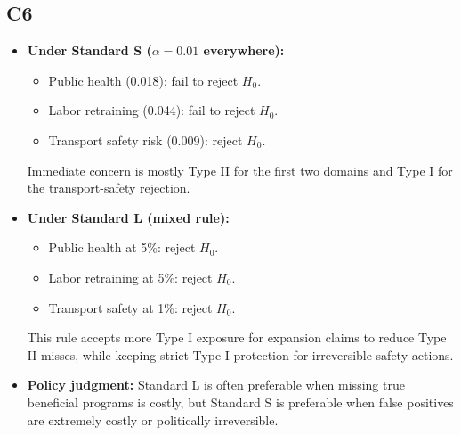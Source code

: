 	\subsection*{C6}
	\begin{itemize}
		\item \textbf{Under Standard S (\(\alpha=0.01\) everywhere):}
		\begin{itemize}
			\item Public health (0.018): fail to reject \(H_0\).
			\item Labor retraining (0.044): fail to reject \(H_0\).
			\item Transport safety risk (0.009): reject \(H_0\).
		\end{itemize}
		Immediate concern is mostly Type II for the first two domains and Type I for the transport-safety rejection.
		\item \textbf{Under Standard L (mixed rule):}
		\begin{itemize}
			\item Public health at 5\%: reject \(H_0\).
			\item Labor retraining at 5\%: reject \(H_0\).
			\item Transport safety at 1\%: reject \(H_0\).
		\end{itemize}
		This rule accepts more Type I exposure for expansion claims to reduce Type II misses, while keeping strict Type I protection for irreversible safety actions.
		\item \textbf{Policy judgment:} Standard L is often preferable when missing true beneficial programs is costly, but Standard S is preferable when false positives are extremely costly or politically irreversible.
	\end{itemize}
	
